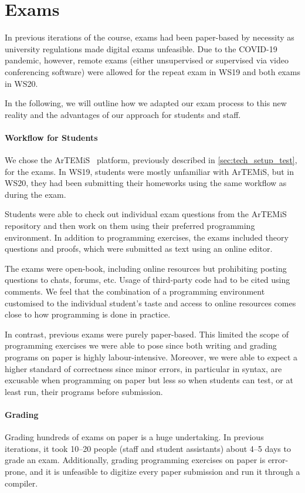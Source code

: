 \section{Exams}\label{sec:exam}
In previous iterations of the course, exams had been paper-based by necessity as university regulations made digital exams unfeasible.
Due to the COVID-19 pandemic, however, remote exams (either unsupervised or supervised via video conferencing software) were allowed for the repeat exam in WS19 and both exams in WS20.

In the following, we will outline how we adapted our exam process to this new reality and the advantages of our approach for students and staff.

\paragraph{Workflow for Students}

We chose the ArTEMiS~\cite{artemis} platform, previously described in \cref{sec:tech_setup_test}, for the exams.
In WS19, students were mostly unfamiliar with ArTEMiS,
but in WS20, they had been submitting their homeworks using the same workflow as during the exam.

Students were able to check out individual exam questions from the ArTEMiS repository and then work on them using their preferred programming environment.
In addition to programming exercises, the exams included theory questions and proofs, which were submitted as text using an online editor.

The exams were open-book, including online resources
but prohibiting posting questions to chats, forums, etc.
Usage of third-party code had to be cited using comments.
We feel that the combination of a programming environment customised to the individual student's taste and access to online resources comes close to how programming is done in practice.

In contrast, previous exams were purely paper-based.
This limited the scope of programming exercises we were able to pose
since both writing and grading programs on paper is highly labour-intensive.
Moreover, we were able to expect a higher standard of correctness
since minor errors, in particular in syntax, are excusable when programming on paper but less so when students can test, or at least run, their programs before submission.

\paragraph{Grading}
Grading hundreds of exams on paper is a huge undertaking.
In previous iterations,
it took 10--20 people (staff and student assistants) about 4--5 days to grade an exam.
Additionally, grading programming exercises on paper is error-prone, and it is unfeasible to digitize every paper submission and run it through a compiler.

